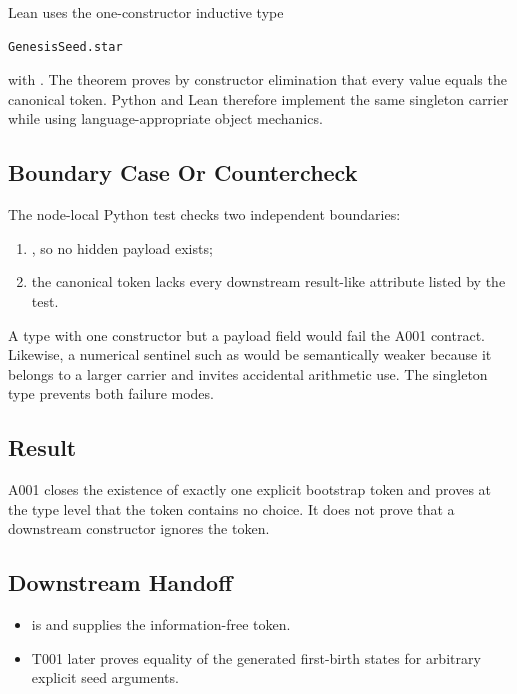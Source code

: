 Lean uses the one-constructor inductive type

\begin{verbatim}
GenesisSeed.star
\end{verbatim}

with \texttt{\protect{}}. The theorem
\texttt{\protect{}} proves by constructor elimination that every value
equals the canonical token. Python and Lean therefore implement the same
singleton carrier while using language-appropriate object mechanics.

\subsection{Boundary Case Or
Countercheck}\label{boundary-case-or-countercheck-3}

The node-local Python test checks two independent boundaries:

\begin{enumerate}
\def\labelenumi{\arabic{enumi}.}
\tightlist
\item
  \texttt{\protect{}}, so no hidden payload
  exists;
\item
  the canonical token lacks every downstream result-like attribute
  listed by the test.
\end{enumerate}

A type with one constructor but a payload field would fail the A001
contract. Likewise, a numerical sentinel such as \texttt{\protect{}} would be
semantically weaker because it belongs to a larger carrier and invites
accidental arithmetic use. The singleton type prevents both failure
modes.

\subsection{Result}\label{result-8}

A001 closes the existence of exactly one explicit bootstrap token and
proves at the type level that the token contains no choice. It does not
prove that a downstream constructor ignores the token.

\subsection{Downstream Handoff}\label{downstream-handoff-8}

\begin{itemize}
\tightlist
\item
  \texttt{\protect{}} is
  \texttt{\protect{}} and supplies the information-free token.
\item
  T001 later proves equality of the generated first-birth states for
  arbitrary explicit seed arguments.
\end{itemize}

